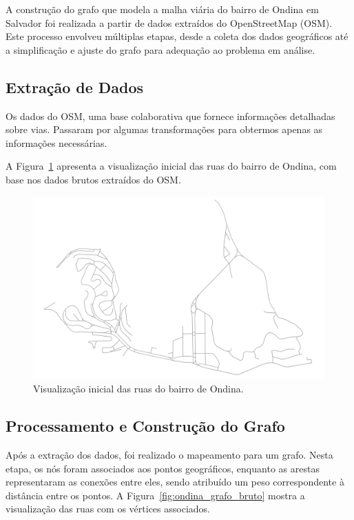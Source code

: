 \documentclass[12pt, a4paper]{report}
\begin{document}
A construção do grafo que modela a malha viária do bairro de Ondina em Salvador foi realizada a partir de dados extraídos do OpenStreetMap (OSM). Este processo envolveu múltiplas etapas, desde a coleta dos dados geográficos até a simplificação e ajuste do grafo para adequação ao problema em análise.

\subsection{Extração de Dados}

Os dados do OSM, uma base colaborativa que fornece informações detalhadas sobre vias. Passaram por algumas transformações para obtermos apenas as informações necessárias.

A Figura~\ref{fig:ondina_ruas} apresenta a visualização inicial das ruas do bairro de Ondina, com base nos dados brutos extraídos do OSM.

\begin{figure}[H]
    \centering
    \includegraphics[width=\textwidth]{visualizacao_inicial}
    \caption{Visualização inicial das ruas do bairro de Ondina.}
    \label{fig:ondina_ruas}
\end{figure}

\subsection{Processamento e Construção do Grafo}

Após a extração dos dados, foi realizado o mapeamento para um grafo. Nesta etapa, os nós foram associados aos pontos geográficos, enquanto as arestas representaram as conexões entre eles, sendo atribuído um peso correspondente à distância entre os pontos. A Figura~\ref{fig:ondina_grafo_bruto} mostra a visualização das ruas com os vértices associados.
\end{document}
